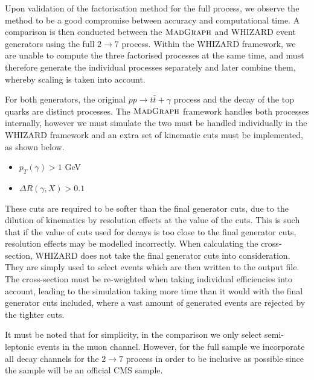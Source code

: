 Upon validation of the factorisation method for the full process, we observe the method to be a good compromise between accuracy and computational time. A comparison is then conducted between the $\textsc{MadGraph}$ and WHIZARD event generators using the full $2 \to 7$ process. Within the WHIZARD framework, we are unable to compute the three factorised processes at the same time, and must therefore generate the individual processes separately and later combine them, whereby scaling is taken into account. 

For both generators, the original $pp \to t\bar{t}+\gamma$ process and the decay of the top quarks are distinct processes. The $\textsc{MadGraph}$ framework handles both processes internally, however we must simulate the two must be handled individually in the WHIZARD framework and an extra set of kinematic cuts must be implemented, as shown below.

\begin{itemize}
	\item $p_T(\gamma) > 1$ GeV
	\item $\Delta R (\gamma, X) > 0.1$
\end{itemize}

These cuts are required to be softer than the final generator cuts, due to the dilution of kinematics by resolution effects at the value of the cuts. This is such that if the value of cuts used for decays is too close to the final generator cuts, resolution effects may be modelled incorrectly. When calculating the cross-section, WHIZARD does not take the final generator cuts into consideration. They are simply used to select events which are then written to the output file. The cross-section must be re-weighted when taking individual efficiencies into account, leading to the simulation taking more time than it would with the final generator cuts included, where a vast amount of generated events are rejected by the tighter cuts.

It must be noted that for simplicity, in the comparison we only select semi-leptonic events in the muon channel. However, for the full sample we incorporate all decay channels for the $2 \to 7$ process in order to be inclusive as possible since the sample will be an official CMS sample. 

